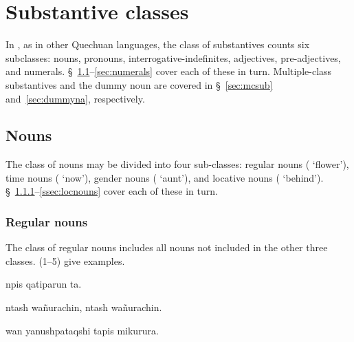 \section{Substantive classes}
In \SYQ{}, as in other Quechuan languages, the class of substantives counts six subclasses: nouns, pronouns, interrogative-indefinites, adjectives, pre-adjectives, and numerals. \S~\ref{sec:nouns}--\ref{sec:numerals} cover each of these in turn. Multiple-class substantives and the dummy noun  are covered in \S~\ref{sec:mcsub} and~\ref{sec:dummyna}, respectively.

\subsection{Nouns}\label{sec:nouns}
The class of nouns may be divided into four sub-classes: regular nouns ( `flower'), time nouns ( `now'), gender nouns ( `aunt'), and locative nouns ( `behind'). \S~\ref{ssec:regnouns}--\ref{ssec:locnouns} cover each of these in turn.

\subsubsection{Regular nouns}\label{ssec:regnouns}
The class of regular nouns includes all nouns not included in the other three classes. (1--5) give examples.

%
{npis qatiparun ta.}%
{}%
{}{}%

%
{ntash wa\~nurachin, ntash wa\~nurachin.}%
{}%
{}{}%

%
{wan yanushpataqshi tapis mikurura.}%
{}%
{}{}%

